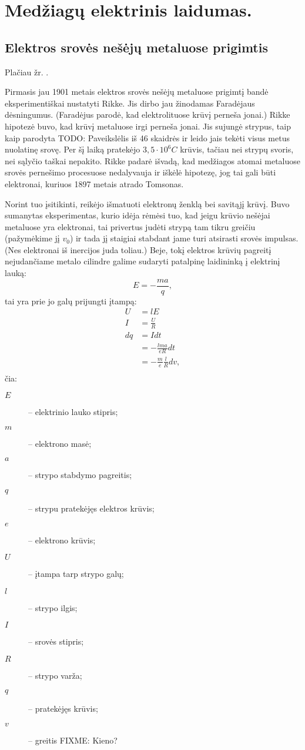 \chapter{Medžiagų elektrinis laidumas.}

\section{Elektros srovės nešėjų metaluose prigimtis}

Plačiau žr. \cite[53p.]{elektra-magnetizmas}.

Pirmasis jau 1901 metais elektros srovės nešėjų metaluose prigimtį
bandė eksperimentiškai nustatyti Rikke. Jis dirbo jau žinodamas
Faradėjaus dėsningumus. (Faradėjus parodė, kad elektrolituose
krūvį perneša jonai.) Rikke hipotezė buvo, kad krūvį metaluose
irgi perneša jonai.  Jis sujungė strypus, taip kaip parodyta TODO:
Paveikslėlis iš 46 skaidrės ir leido jais tekėti visus metus
nuolatinę srovę. Per šį laiką pratekėjo $3,5\cdot 10^{6}C$
krūvis, tačiau nei strypų svoris, nei sąlyčio taškai nepakito.
Rikke padarė išvadą, kad medžiagos atomai metaluose srovės
pernešimo procesuose nedalyvauja ir iškėlė hipotezę, jog
tai gali būti elektronai, kuriuos 1897 metais atrado Tomsonas.

Norint tuo įsitikinti, reikėjo išmatuoti elektronų ženklą bei
savitąjį krūvį. Buvo sumanytas eksperimentas, kurio idėja rėmėsi
tuo, kad jeigu krūvio nešėjai metaluose yra elektronai,
tai privertus judėti strypą tam tikru greičiu (pažymėkime jį
$v_{0}$) ir tada jį staigiai stabdant jame turi atsirasti srovės
impulsas. (Nes elektronai iš inercijos juda toliau.) Beje, tokį
elektros krūvių pagreitį nejudančiame metalo cilindre galime
sudaryti patalpinę laidininką į elektrinį lauką:
\begin{equation*}
  E = -\frac{ma}{q},
\end{equation*}
tai yra prie jo galų prijungti įtampą:
\begin{align*}
  U &= lE \\
  I &= \frac{U}{R} \\
  dq
  &= Idt \\
  &= -\frac{lma}{eR}dt \\
  &= -\frac{m}{e}\frac{l}{R}dv, \\
\end{align*}
čia:
\begin{description}
  \item[$E$] – elektrinio lauko stipris;
  \item[$m$] – elektrono masė;
  \item[$a$] – strypo stabdymo pagreitis;
  \item[$q$] – strypu pratekėjęs elektros krūvis;
  \item[$e$] – elektrono krūvis;
  \item[$U$] – įtampa tarp strypo galų;
  \item[$l$] – strypo ilgis;
  \item[$I$] – srovės stipris;
  \item[$R$] – strypo varža;
  \item[$q$] – pratekėjęs krūvis;
  \item[$v$] – greitis FIXME: Kieno?
\end{description}

